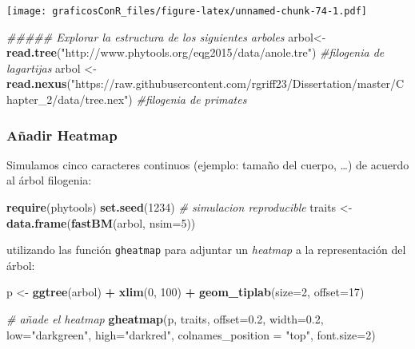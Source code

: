 \documentclass[]{article}
\newenvironment{Shaded}{\begin{snugshade}}{\end{snugshade}}
\newcommand{\CommentTok}[1]{\textcolor[rgb]{0.56,0.35,0.01}{\textit{#1}}}
\newcommand{\DataTypeTok}[1]{\textcolor[rgb]{0.13,0.29,0.53}{#1}}
\newcommand{\DecValTok}[1]{\textcolor[rgb]{0.00,0.00,0.81}{#1}}
\newcommand{\FloatTok}[1]{\textcolor[rgb]{0.00,0.00,0.81}{#1}}
\newcommand{\KeywordTok}[1]{\textcolor[rgb]{0.13,0.29,0.53}{\textbf{#1}}}
\newcommand{\NormalTok}[1]{#1}
\newcommand{\OperatorTok}[1]{\textcolor[rgb]{0.81,0.36,0.00}{\textbf{#1}}}
\newcommand{\StringTok}[1]{\textcolor[rgb]{0.31,0.60,0.02}{#1}}
\numberwithin{ejcnt}{section}
\begin{document}
\texttt{[image: graficosConR\_files/figure-latex/unnamed-chunk-74-1.pdf]}

\begin{Shaded}
\begin{Highlighting}[]
\CommentTok{##### Explorar la estructura de los siguientes arboles}
\NormalTok{arbol<-}\KeywordTok{read.tree}\NormalTok{(}\StringTok{"http://www.phytools.org/eqg2015/data/anole.tre"}\NormalTok{) }\CommentTok{#filogenia de lagartijas}
\NormalTok{arbol <-}\StringTok{ }\KeywordTok{read.nexus}\NormalTok{(}\StringTok{"https://raw.githubusercontent.com/rgriff23/Dissertation/master/Chapter_2/data/tree.nex"}\NormalTok{) }\CommentTok{#filogenia de primates}
\end{Highlighting}
\end{Shaded}

\hypertarget{anadir-heatmap}{%
\subsubsection{Añadir Heatmap}\label{anadir-heatmap}}

Simulamos cinco caracteres continuos (ejemplo: tamaño del cuerpo, \ldots) de acuerdo al árbol filogenia:

\begin{Shaded}
\begin{Highlighting}[]
\KeywordTok{require}\NormalTok{(phytools)}
\KeywordTok{set.seed}\NormalTok{(}\DecValTok{1234}\NormalTok{) }\CommentTok{# simulacion reproducible}
\NormalTok{traits <-}\StringTok{ }\KeywordTok{data.frame}\NormalTok{(}\KeywordTok{fastBM}\NormalTok{(arbol, }\DataTypeTok{nsim=}\DecValTok{5}\NormalTok{))}
\end{Highlighting}
\end{Shaded}

utilizando las función \texttt{gheatmap} para adjuntar un \emph{heatmap} a la representación del árbol:

\begin{Shaded}
\begin{Highlighting}[]
\NormalTok{p <-}\StringTok{ }\KeywordTok{ggtree}\NormalTok{(arbol) }\OperatorTok{+}\StringTok{ }\KeywordTok{xlim}\NormalTok{(}\DecValTok{0}\NormalTok{, }\DecValTok{100}\NormalTok{) }\OperatorTok{+}\StringTok{ }\KeywordTok{geom_tiplab}\NormalTok{(}\DataTypeTok{size=}\DecValTok{2}\NormalTok{, }\DataTypeTok{offset=}\DecValTok{17}\NormalTok{) }

\CommentTok{# añade el heatmap}
\KeywordTok{gheatmap}\NormalTok{(p, traits, }\DataTypeTok{offset=}\FloatTok{0.2}\NormalTok{, }\DataTypeTok{width=}\FloatTok{0.2}\NormalTok{, }\DataTypeTok{low=}\StringTok{"darkgreen"}\NormalTok{, }\DataTypeTok{high=}\StringTok{"darkred"}\NormalTok{, }\DataTypeTok{colnames_position =} \StringTok{"top"}\NormalTok{, }\DataTypeTok{font.size=}\DecValTok{2}\NormalTok{)}
\end{Highlighting}
\end{Shaded}
\end{document}
